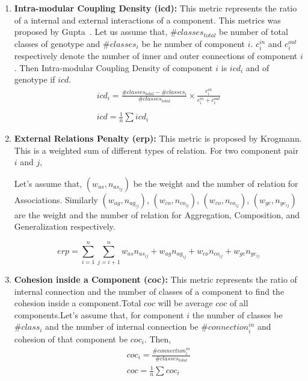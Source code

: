 \documentclass[letterpaper, 10 pt, conference]{ieeeconf}  %
\begin{document}
\begin{enumerate}
\item \textbf{Intra-modular Coupling Density (icd):} This metric represents the ratio of a internal and external interactions of a component. This metrics was proposed by Gupta~\cite{gupta2012optimization}. \newline
 Let us assume that, $\#classes_{total}$ be number of total classes of genotype and $\#classes_{i}$
be he number of component $i$. $c^{in}_i$ and $c^{out}_i$ respectively denote the number of inner and outer connections of component $i$. Then Intra-modular Coupling Density of component $i$ is $icd_{i}$ and of genotype if $icd$.
\begin{equation}\label{icd_eq}
 \begin{array}{l}
icd_{i}=\frac{\#classes_{total}-\#classes_{i}}{\#classes_{total}}\times\frac{c^{in}_i}{c^{in}_i+c^{out}_i} \\\\
icd=\frac{1}{n}\sum{icd_{i}}
\end{array}
\end{equation}
\item \textbf{External Relations Penalty (erp):} This metric is proposed by Krogmann\cite{krogmann2012reconstruction}. This is a weighted sum of different types of relation. For two component pair $i$ and $j$,

Let's assume that,
$(w_{as},n_{as_{ij}})$ be the weight and the number of relation for Associations. Similarly
$(w_{ag},n_{ag_{ij}})$,
$(w_{co}, n_{co_{ij}})$,
$(w_{co} ,n_{co_{ij}})$, $(w_{ge},n_{ge_{ij}})$ are  the weight and the number of relation for Aggregation, Composition, and Generalization respectively.


\begin{equation}\label{erp_eq}
 erp=\sum_{i=1}^{n}{\sum_{j=i+1}^{n}}{w_{as}n_{as_{ij}}+
 w_{ag}n_{ag_{ij}}+
 w_{co}n_{co_{ij}}+
 w_{ge}n_{ge_{ij}}
}
\end{equation}
\item \textbf{Cohesion inside a Component (coc):}
This metric represents the ratio of internal connection and the number of classes of a component to find the cohesion inside a component.Total $coc$ will be average $coc$ of all components.Let's assume that, for component $i$ the number of classes be $\#class_{i}$ and  the number of internal connection be $\#connection^{in}_{i}$ and cohesion of that component be $coc_{i}$. Then,
\begin{equation}\label{coc_eq}
 \begin{array}{l}
coc_{i}=\frac{\#connection^{in}_{i}}{\#classes_{total}} \\
coc=\frac{1}{n}\sum{coc_{i}}
\end{array}
\end{equation}


\end{enumerate}
\end{document}
